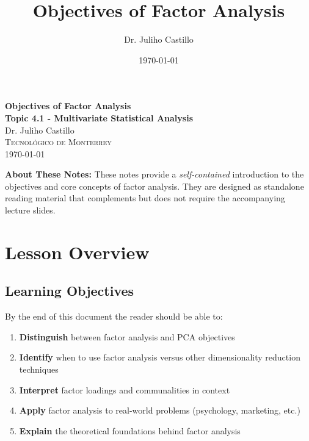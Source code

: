 \documentclass[a4paper]{tufte-book}
\title{Objectives of Factor Analysis}
\author{Dr. Juliho Castillo}
\date{\today}
\newcommand{\tecbluetext}[1]{\textcolor{tecblue}{\textbf{#1}}}
\newcommand{\tecorangetext}[1]{\textcolor{tecorange}{\textbf{#1}}}
\begin{document}
\begingroup
  \centering
  {\Huge\tecbluetext{Objectives of Factor Analysis}}\\[0.8em]
  {\Large\tecorangetext{Topic 4.1 - Multivariate Statistical Analysis}}\\[1.2em]
  {\large Dr. Juliho Castillo}\\[0.3em]
  {\normalsize\textsc{Tecnológico de Monterrey}}\\[0.8em]
  {\small\textcolor{tecblue}{\today}}
\par\vspace{2em}\endgroup

\noindent\tecbluetext{About These Notes:} These notes provide a \textit{self-contained} introduction to the objectives and core concepts of factor analysis. They are designed as standalone reading material that complements but does not require the accompanying lecture slides.


\tableofcontents
\newpage

\section{Lesson Overview}

\subsection{Learning Objectives}
By the end of this document the reader should be able to:
\begin{enumerate}[leftmargin=*,itemsep=0.5em]
  \item \tecbluetext{Distinguish} between factor analysis and PCA objectives
  \item \tecbluetext{Identify} when to use factor analysis versus other dimensionality reduction techniques
  \item \tecbluetext{Interpret} factor loadings and communalities in context
  \item \tecbluetext{Apply} factor analysis to real-world problems (psychology, marketing, etc.)
  \item \tecbluetext{Explain} the theoretical foundations behind factor analysis
\end{enumerate}
\end{document}
